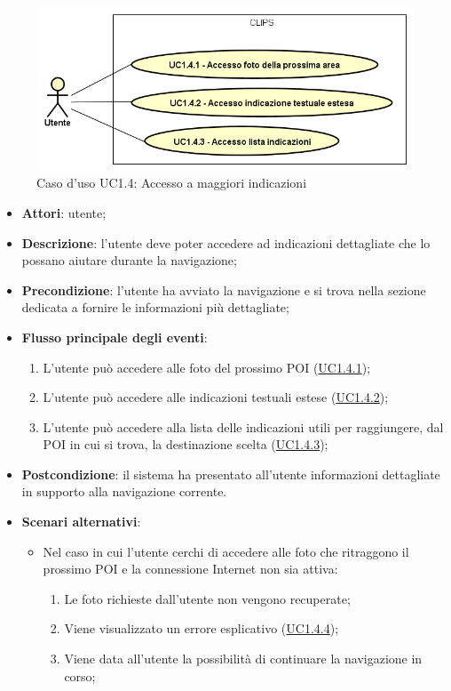 \documentclass[../AnalisiDeiRequisiti.tex]{subfiles}
\begin{document}
\begin{figure}[H]
	\centering
	\includegraphics[scale=0.95, width=\textwidth]{img/UC1-4.png}
	\caption{Caso d'uso UC1.4: Accesso a maggiori indicazioni}\label{fig:UC1.4} 
\end{figure}
\begin{itemize}
	\item \textbf{Attori}: utente;
	\item \textbf{Descrizione}: l'utente deve poter accedere ad indicazioni dettagliate che lo possano aiutare durante la navigazione; 
	\item \textbf{Precondizione}: l'utente ha avviato la navigazione e si trova nella sezione dedicata a fornire le informazioni più dettagliate;
	
	\item \textbf{Flusso principale degli eventi}:
	\begin{enumerate}
		\item L'utente può accedere alle foto del prossimo POI (\hyperlink{UC1.4.1}{UC1.4.1});
		\item L'utente può accedere alle indicazioni testuali estese (\hyperlink{UC1.4.2}{UC1.4.2});
		\item L'utente può accedere alla lista delle indicazioni utili per raggiungere, dal POI in cui si trova, la destinazione scelta (\hyperlink{UC1.4.3}{UC1.4.3});
		
	\end{enumerate}
	\item \textbf{Postcondizione}: il sistema ha presentato all'utente informazioni dettagliate in supporto alla navigazione corrente.
	\item \textbf{Scenari alternativi}: 
	\begin{itemize}
		\item Nel caso in cui l'utente cerchi di accedere alle foto che ritraggono il prossimo POI e la connessione Internet non sia attiva: 
		\begin{enumerate}
			\item Le foto richieste dall'utente non vengono recuperate;
			\item Viene visualizzato un errore esplicativo (\hyperlink{UC1.4.4}{UC1.4.4});
			\item Viene data all'utente la possibilità di continuare la navigazione in corso;
		\end{enumerate}
	\end{itemize}
\end{itemize}
\hypertarget{UC1.4.1}{}
\end{document}
